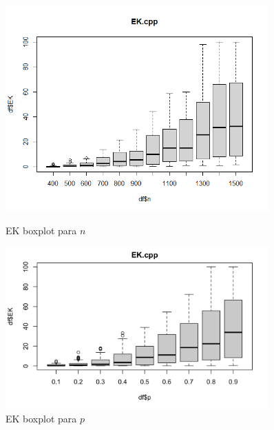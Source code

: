 \documentclass{uofa-eng-assignment}
\begin{document}
\begin{figure}[h]
    \begin{minipage}{0.45\textwidth}
        \centering
        \includegraphics[width=0.9\textwidth]{ek-n.png}
        \caption{EK boxplot para $n$}
        \label{fig:boxplot-ek-n}
    \end{minipage}
    \hfill
    \begin{minipage}{0.45\textwidth}
        \centering
        \includegraphics[width=0.9\textwidth]{ek-p.png}
        \caption{EK boxplot para $p$}
        \label{fig:boxplot-ek-p}
    \end{minipage}
\end{figure}
\end{document}
